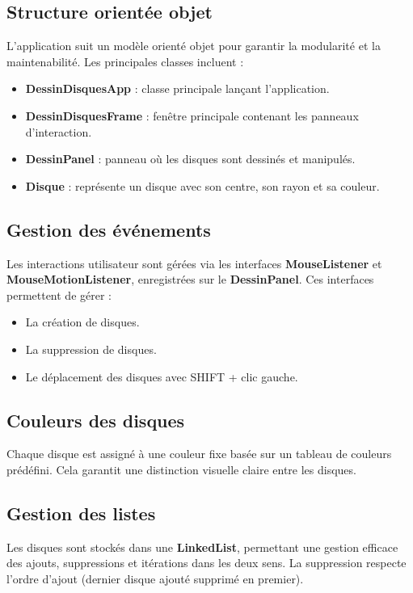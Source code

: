 \documentclass[12pt]{report}
\begin{document}
    \subsection*{Structure orientée objet}
    L'application suit un modèle orienté objet pour garantir la modularité et la maintenabilité. Les principales classes incluent :
    \begin{itemize}
        \item \textbf{DessinDisquesApp} : classe principale lançant l'application.
        \item \textbf{DessinDisquesFrame} : fenêtre principale contenant les panneaux d'interaction.
        \item \textbf{DessinPanel} : panneau où les disques sont dessinés et manipulés.
        \item \textbf{Disque} : représente un disque avec son centre, son rayon et sa couleur.
    \end{itemize}

    \subsection*{Gestion des événements}
    Les interactions utilisateur sont gérées via les interfaces \textbf{MouseListener} et \textbf{MouseMotionListener}, enregistrées sur le \textbf{DessinPanel}. Ces interfaces permettent de gérer :
    \begin{itemize}
        \item La création de disques.
        \item La suppression de disques.
        \item Le déplacement des disques avec SHIFT + clic gauche.
    \end{itemize}

    \subsection*{Couleurs des disques}
    Chaque disque est assigné à une couleur fixe basée sur un tableau de couleurs prédéfini. Cela garantit une distinction visuelle claire entre les disques.

    \subsection*{Gestion des listes}
    Les disques sont stockés dans une \textbf{LinkedList}, permettant une gestion efficace des ajouts, suppressions et itérations dans les deux sens.
    La suppression respecte l'ordre d'ajout (dernier disque ajouté supprimé en premier).
\end{document}
